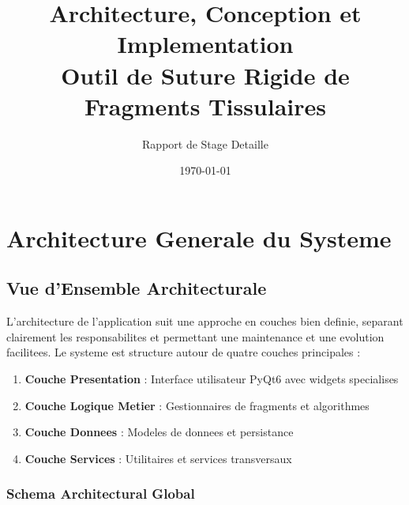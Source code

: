 \documentclass[12pt,a4paper]{article}
\begin{document}
\title{Architecture, Conception et Implementation\\Outil de Suture Rigide de Fragments Tissulaires}
\author{Rapport de Stage Detaille}
\date{\today}
\maketitle

\tableofcontents
\newpage

\section{Architecture Generale du Systeme}

\subsection{Vue d'Ensemble Architecturale}

L'architecture de l'application suit une approche en couches bien definie, separant clairement les responsabilites et permettant une maintenance et une evolution facilitees. Le systeme est structure autour de quatre couches principales :

\begin{enumerate}
\item \textbf{Couche Presentation} : Interface utilisateur PyQt6 avec widgets specialises
\item \textbf{Couche Logique Metier} : Gestionnaires de fragments et algorithmes
\item \textbf{Couche Donnees} : Modeles de donnees et persistance
\item \textbf{Couche Services} : Utilitaires et services transversaux
\end{enumerate}

\subsubsection{Schema Architectural Global}
\end{document}
